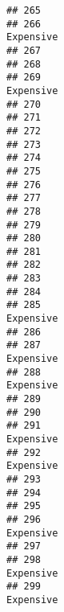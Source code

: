 \documentclass[
]{article}
\begin{document}
\begin{verbatim}
## 265                                                                    
## 266                                                          Expensive 
## 267                                                                    
## 268                                                                    
## 269                                                          Expensive 
## 270                                                                    
## 271                                                                    
## 272                                                                    
## 273                                                                    
## 274                                                                    
## 275                                                                    
## 276                                                                    
## 277                                                                    
## 278                                                                    
## 279                                                                    
## 280                                                                    
## 281                                                                    
## 282                                                                    
## 283                                                                    
## 284                                                                    
## 285                                                          Expensive 
## 286                                                                    
## 287                                                          Expensive 
## 288                                                          Expensive 
## 289                                                                    
## 290                                                                    
## 291                                                          Expensive 
## 292                                                          Expensive 
## 293                                                                    
## 294                                                                    
## 295                                                                    
## 296                                                          Expensive 
## 297                                                                    
## 298                                                          Expensive 
## 299                                                          Expensive 

\end{verbatim}
\end{document}
